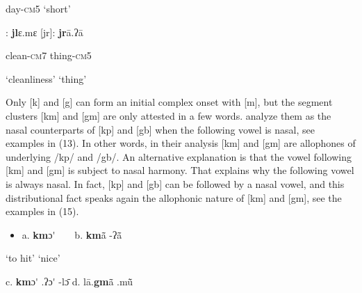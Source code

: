 \begin{styleindexi}
                      day-\textsc{cm}5                                            ‘short’
\end{styleindexi}

\begin{styleindexi}
          [jl]:         \textbf{jl}ɛ.mɛ                                   [jr]:       \textbf{jr}ā.ʔā       
\end{styleindexi}

\begin{styleindexi}
                      clean-\textsc{cm}7                                        thing-\textsc{cm}5    
\end{styleindexi}

\begin{styleindexi}
                      ‘cleanliness’                                      ‘thing’
\end{styleindexi}

Only [k] and [g] can form an initial complex onset with [m], but the segment clusters [km] and [gm] are only attested in a few words. \citet{HeraultMlanhoro1973} analyze them as the nasal counterparts of [kp] and [gb] when the following vowel is nasal, see examples in (13). In other words, in their analysis [km] and [gm] are allophones of underlying /kp/ and /gb/. An alternative explanation is that the vowel following [km] and [gm] is subject to nasal harmony. That explains why the following vowel is always nasal. In fact, [kp] and [gb] can be followed by a nasal vowel, and this distributional fact speaks again the allophonic nature of [km] and [gm], see the examples in (15).

\begin{itemize}
\item \begin{styleindexi}
\label{bkm:Ref470793992}    a.   \textbf{km}ɔ\'{} ~ ~                                        b.    \textbf{km}ã\={} -ʔã\={}             
\end{styleindexi}\end{itemize}
\begin{styleindexi}
                ‘to hit’                                            ‘nice’
\end{styleindexi}

\begin{styleindexi}
            c.   \textbf{km}ɔ\'{} .ʔɔ\'{} -lɔ\={}                                    d.    lā.\textbf{gm}ã\={} .mũ\={}  
\end{styleindexi}


